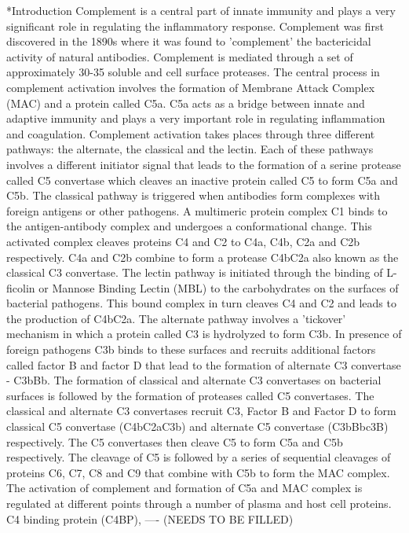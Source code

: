\documentclass[12pt]{article}
\makeatletter
\renewcommand\section{\@startsection
	{subsection}{2}{0mm}
	{-0.2in}
	{0.05\baselineskip}
	{\normalfont\large\bfseries}}
\makeatother
\begin{document}
\section*{Introduction}
Complement is a central part of innate immunity and plays a very significant role in regulating the inflammatory response. Complement was first discovered in the 1890s where it was found to 'complement' the bactericidal activity of natural antibodies. Complement is mediated through a set of approximately 30-35 soluble and cell surface proteases. The central process in complement activation involves the formation of Membrane Attack Complex (MAC) and a protein called C5a. C5a acts as a bridge between innate and adaptive immunity and plays a very important role in regulating inflammation and coagulation.  Complement activation takes places through three different pathways: the alternate, the classical and the lectin. Each of these pathways involves a different initiator signal that leads to the formation of a serine protease called C5 convertase which cleaves an inactive protein called C5 to form C5a and C5b. The classical pathway is triggered when antibodies form complexes with foreign antigens or other pathogens. A multimeric protein complex C1 binds to the antigen-antibody complex and undergoes a conformational change. This activated complex cleaves proteins C4 and C2 to C4a, C4b, C2a and C2b respectively. C4a and C2b combine to form a protease C4bC2a also known as the classical C3 convertase. The lectin pathway is initiated through the binding of L-ficolin or Mannose Binding Lectin (MBL) to the carbohydrates on the surfaces of bacterial pathogens. This bound complex in turn cleaves C4 and C2 and leads to the production of C4bC2a. The alternate pathway involves a 'tickover' mechanism in which a protein called C3 is hydrolyzed to form C3b. In presence of foreign pathogens C3b binds to these surfaces and recruits  additional factors called factor B and factor D that lead to the formation of alternate C3 convertase - C3bBb. The formation of classical and alternate C3 convertases on bacterial surfaces is followed by the formation of proteases called C5 convertases. The classical and alternate C3 convertases recruit C3, Factor B and Factor D to form classical C5 convertase (C4bC2aC3b) and alternate C5 convertase (C3bBbc3B) respectively. The C5 convertases then cleave C5 to form C5a and C5b respectively. 	The cleavage of C5 is followed by a series of sequential cleavages of proteins C6, C7, C8 and C9 that combine with C5b to form the MAC complex.  The activation of complement and formation of C5a and MAC complex is regulated at different points through a number of plasma and host cell proteins.  C4 binding protein (C4BP), ---- (NEEDS TO BE FILLED)
\end{document}
